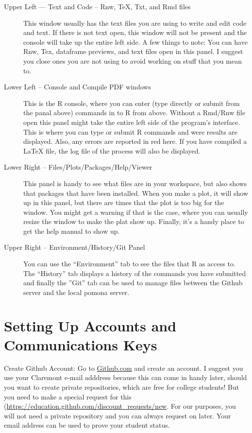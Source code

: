 \documentclass[12pt]{../SOP4_alpha}\usepackage[]{graphicx}\usepackage[]{xcolor}
\begin{document}
\begin{description}
  \item[Upper Left --- Text and Code -- Rnw, \TeX, Txt, and Rmd files] This window usually has the text files you are using to write and edit code and text. If there is not text open, this window will not be present and the console will take up the entire left side. A few things to note: You can have Rnw, Tex, dataframe previews, and text files open in this panel. I suggest you close ones you are not using to avoid working on stuff that you mean to.  
  
  \item[Lower Left -- Console and Compile PDF windows] This is the R console, where you can enter (type directly or submit from the panal above) commands in to R from above. Without a Rmd/Rnw file open this panel might take the entire left side of the program's interface. This is where you can type or submit R commands and were results are displayed. Also, any errors are reported in red here. If you have compiled a LaTeX file, the log file of the process will also be displayed.
  
  \item[Lower Right -- Files/Plots/Packages/Help/Viewer] This panel is handy to see what files are in your workspace, but also shows that packages that have been installed. When you make a plot, it will show up in this panel, but there are times that the plot is too big for the window. You might get a warning if that is the case, where you can usually resize the window to make the plat show up. Finally, it's a handy place to get the help manual to show up. 

  \item[Upper Right -- Environment/History/Git Panel] You can use the ``Environment'' tab to see the files that R as access to. The ``History'' tab displays a history of the commands you have submitted and finally the ''Git'' tab can be used to manage files between the Github server and the local pomona server. 
  
\end{description}

\section{Setting Up Accounts and Communications Keys}

\NP Create Github Account: Go to \href{http:\\github.com}{Github.com} and create an account. I suggest you use your Claremont e-mail adddress because this can come in handy later, should you want to create private repositories, which are free for college students! But you need to make a special request for this (\url{https://education.github.com/discount_requests/new}. For our purposes, you will not need a private repository and you can always request on later. Your email address can be used to prove your student status. 
  
\end{document}
